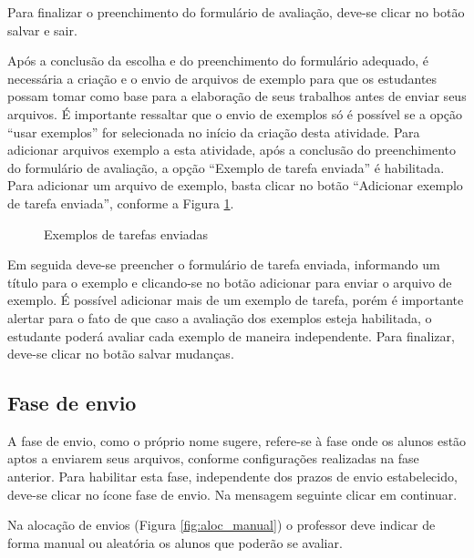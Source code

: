 Para finalizar o preenchimento do formulário de avaliação, deve-se clicar no botão salvar e sair.

Após a conclusão da escolha e do preenchimento do formulário adequado, é necessária a criação e o envio de arquivos de exemplo para que os estudantes possam tomar como base para a elaboração de seus trabalhos antes de enviar seus arquivos. É importante ressaltar que o envio de exemplos só é possível se a opção “usar exemplos” for selecionada no início da criação desta atividade. Para adicionar arquivos exemplo a esta atividade, após a conclusão do preenchimento do formulário de avaliação, a opção “Exemplo de tarefa enviada” é habilitada. Para adicionar um arquivo de exemplo, basta clicar no botão “Adicionar exemplo de tarefa enviada”, conforme a Figura \ref{fig:exe_tarefas}.

\begin{figure}[htbp]
 \begin{center}
  \caption{Exemplos de tarefas enviadas}
  \label{fig:exe_tarefas}
 \end{center}
\end{figure}

Em seguida deve-se preencher o formulário de tarefa enviada, informando um título para o exemplo e clicando-se no botão adicionar para enviar o arquivo de exemplo. É possível adicionar mais de um exemplo de tarefa, porém é importante alertar para o fato de que caso a avaliação dos exemplos esteja habilitada, o estudante poderá avaliar cada exemplo de maneira independente. Para finalizar, deve-se clicar no botão salvar mudanças.

\subsection{Fase de envio}

A fase de envio, como o próprio nome sugere, refere-se à fase onde os alunos estão aptos a enviarem seus arquivos, conforme configurações realizadas na fase anterior. Para habilitar esta fase, independente dos prazos de envio estabelecido, deve-se clicar no ícone fase de envio. Na mensagem seguinte clicar em continuar.

Na alocação de envios (Figura \ref{fig:aloc_manual}) o professor deve indicar de forma manual ou aleatória os alunos que poderão se avaliar.

